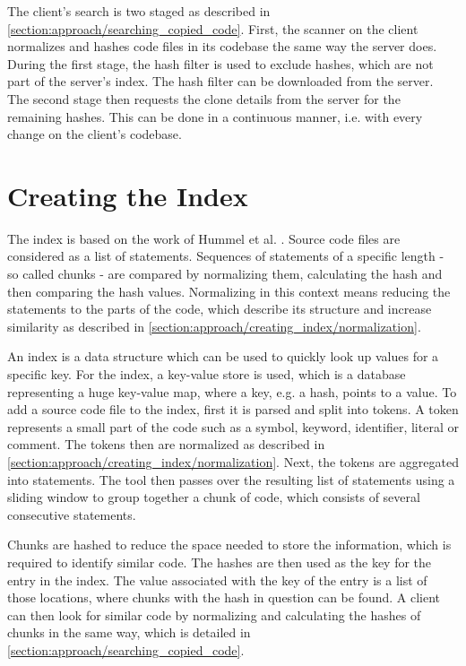 The client's search is two staged as described in \autoref{section:approach/searching_copied_code}.
First, the scanner on the client normalizes and hashes code files in its codebase the same way the server does.
During the first stage, the hash filter is used to exclude hashes, which are not part of the server's index.
The hash filter can be downloaded from the server.
The second stage then requests the clone details from the server for the remaining hashes.
This can be done in a continuous manner, i.e. with every change on the client's codebase.

\section{Creating the Index}\label{section:approach/creating_index}
The index is based on the work of Hummel et al. \cite{hummel2010index}.
Source code files are considered as a list of statements.
Sequences of statements of a specific length - so called chunks - are compared by normalizing them, calculating the hash and then comparing the hash values.
Normalizing in this context means reducing the statements to the parts of the code, which describe its structure and increase similarity as described in \autoref{section:approach/creating_index/normalization}.

An index is a data structure which can be used to quickly look up values for a specific key.
For the index, a key-value store is used, which is a database representing a huge key-value map, where a key, e.g. a hash, points to a value.
To add a source code file to the index, first it is parsed and split into tokens.
A token represents a small part of the code such as a symbol, keyword, identifier, literal or comment.
The tokens then are normalized as described in \autoref{section:approach/creating_index/normalization}.
Next, the tokens are aggregated into statements.
The tool then passes over the resulting list of statements using a sliding window to group together a chunk of code, which consists of several consecutive statements.

Chunks are hashed to reduce the space needed to store the information, which is required to identify similar code.
The hashes are then used as the key for the entry in the index.
The value associated with the key of the entry is a list of those locations, where chunks with the hash in question can be found.
A client can then look for similar code by normalizing and calculating the hashes of chunks in the same way, which is detailed in \autoref{section:approach/searching_copied_code}.

